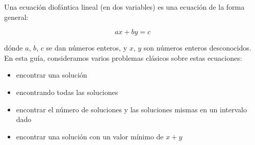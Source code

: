 Una ecuación diofántica lineal (en dos variables) es una ecuación de la forma general:

$$ax + by = c$$

dónde $a$, $b$, $c$ se dan números enteros, y $x$, $y$ son números enteros desconocidos. En esta guía, consideramos varios problemas clásicos sobre estas ecuaciones:

\begin{itemize}
	\item encontrar una solución
	\item encontrando todas las soluciones
	\item encontrar el número de soluciones y las soluciones mismas en un intervalo dado
	\item encontrar una solución con un valor mínimo de $x+y$
\end{itemize}